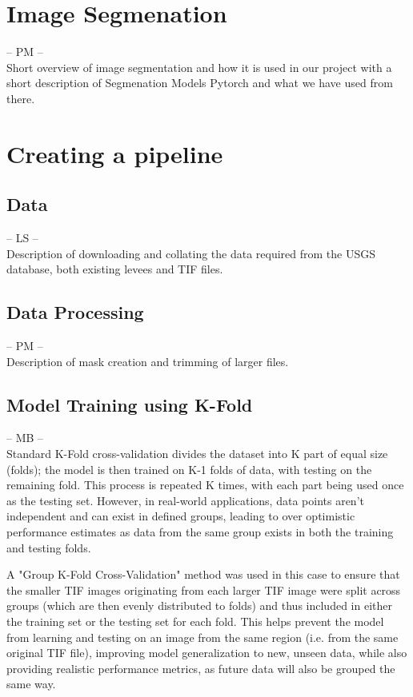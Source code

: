 \documentclass[NOTE, disdraft=true, UKenglish]{\DISCDTLATEXPATH UCLCDTDISdoc}
\begin{document}
\section{Image Segmenation}
\label{sec:method}
%
-- PM --\\
Short overview of image segmentation and how it is used in our project with a short description of Segmenation Models Pytorch and what we have used from there.
\section{Creating a pipeline}
\label{sec:results}
%
\subsection{Data}
-- LS --\\
Description of downloading and collating the data required from the USGS database, both existing levees and TIF files.
\subsection{Data Processing}
-- PM --\\
Description of mask creation and trimming of larger files.
\subsection{Model Training using K-Fold}
-- MB --\\
Standard K-Fold cross-validation divides the dataset into K part of equal size (folds); the model is then trained on K-1 folds of data, with testing on the remaining fold. This process is repeated K times, with each part being used once as the testing set. However, in real-world applications, data points aren't independent and can exist in defined groups, leading to over optimistic performance estimates as data from the same group exists in both the training and testing folds.

A "Group K-Fold Cross-Validation" method was used in this case to ensure that the smaller TIF images originating from each larger TIF image were split across groups (which are then evenly distributed to folds) and thus included in either the training set or the testing set for each fold. This helps prevent the model from learning and testing on an image from the same region (i.e. from the same original TIF file), improving model generalization to new, unseen data, while also providing realistic performance metrics, as future data will also be grouped the same way.
\end{document}
